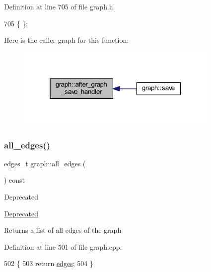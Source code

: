 Definition at line 705 of file graph.\+h.


\begin{DoxyCode}
705 \{ \};
\end{DoxyCode}
Here is the caller graph for this function\+:\nopagebreak
\begin{figure}[H]
\begin{center}
\leavevmode
\includegraphics[width=277pt]{classgraph_af0c7aba21d57d827ae96cae632441651_icgraph}
\end{center}
\end{figure}
\mbox{\label{classgraph_aa0c7027e0cc7430b77ab9629eecefd3f}} 
\subsubsection{\texorpdfstring{all\+\_\+edges()}{all\_edges()}}
{\footnotesize\ttfamily \mbox{\hyperlink{edge_8h_a8f9587479bda6cf612c103494b3858e3}{edges\+\_\+t}} graph\+::all\+\_\+edges (\begin{DoxyParamCaption}{ }\end{DoxyParamCaption}) const\hspace{0.3cm}{\ttfamily [inherited]}}

\begin{DoxyRefDesc}{Deprecated}
\item[\mbox{\hyperlink{deprecated__deprecated000004}{Deprecated}}]\end{DoxyRefDesc}
\begin{DoxyReturn}{Returns}
a list of all edges of the graph 
\end{DoxyReturn}


Definition at line 501 of file graph.\+cpp.


\begin{DoxyCode}
502 \{
503     \textcolor{keywordflow}{return} \mbox{\hyperlink{classgraph_ab5b1c610cca1bcf72b05aacc28a48153}{edges}};
504 \}
\end{DoxyCode}
\mbox{\label{classgraph_a268af566b8df2cbaede1319ad370dc7e}} 
